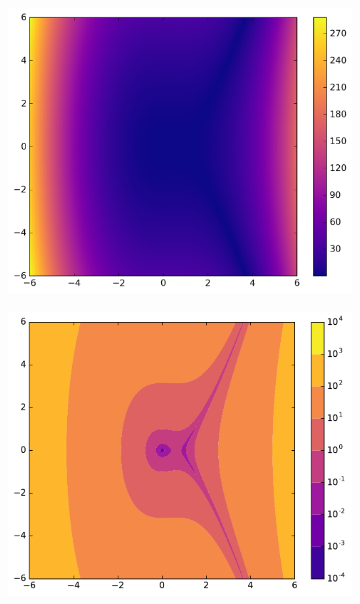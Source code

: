 \begin{figure}[H] %
\centering
\begin{subfigure}{.495\textwidth}
    \centering
    \includegraphics[width=\linewidth]{figures/heatmap_3.png}
\end{subfigure}
%
\begin{subfigure}{.495\textwidth}
    \centering
    \includegraphics[width=\linewidth]{figures/contour_3.pdf}
\end{subfigure}
\end{figure}

